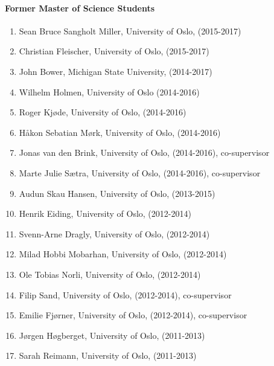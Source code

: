 \documentclass[a4wide,10pt]{article}
\begin{document}
\paragraph{Former Master of Science Students}
\begin{enumerate}
\item Sean Bruce Sangholt Miller, University of Oslo, (2015-2017)

\item Christian Fleischer, University of Oslo, (2015-2017)

\item John Bower, Michigan State University, (2014-2017)

\item Wilhelm Holmen, University of Oslo (2014-2016)

\item Roger Kjøde, University of Oslo, (2014-2016)

\item Håkon Sebatian Mørk, University of Oslo, (2014-2016)

\item Jonas van den Brink, University of Oslo, (2014-2016), co-supervisor

\item Marte Julie Sætra, University of Oslo, (2014-2016), co-supervisor

\item Audun Skau Hansen, University of Oslo, (2013-2015)

\item Henrik Eiding, University of Oslo, (2012-2014)

\item Svenn-Arne Dragly, University of Oslo, (2012-2014)

\item Milad Hobbi Mobarhan, University of Oslo, (2012-2014)

\item Ole Tobias Norli, University of Oslo, (2012-2014)

\item Filip Sand, University of Oslo, (2012-2014), co-supervisor

\item Emilie Fjørner, University of Oslo, (2012-2014), co-supervisor

\item Jørgen Høgberget, University of Oslo, (2011-2013)

\item Sarah Reimann, University of Oslo, (2011-2013)


\end{enumerate}
\end{document}
